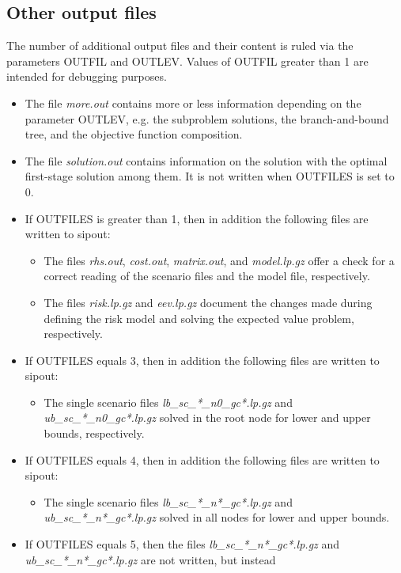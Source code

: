 \documentclass[11pt,draft]{article}
\newcommand{\+}{{\ti{+}}}
\newcommand{\1}{{\ti{1}}}
\begin{document}
\subsection{Other output files}
The number of additional output files and their content is ruled via the parameters OUTFIL and
OUTLEV. Values of OUTFIL greater than 1 are intended for debugging purposes.
\begin{itemize}
\item The file {\it more.out} contains more or less information depending on the parameter OUTLEV,
e.g. the subproblem solutions, the branch-and-bound tree, and the objective function composition. 
\item The file {\it solution.out} contains information on the solution with the optimal first-stage
solution among them. It is not written when OUTFILES is set to 0.
\item If OUTFILES is greater than 1, then in addition the following files are written to sipout:
\begin{itemize}
\item The files {\it rhs.out}, {\it cost.out}, {\it matrix.out}, and {\it model.lp.gz} offer a check
for a correct reading of the scenario files and the model file, respectively. 
\item The files {\it risk.lp.gz} and {\it eev.lp.gz} document the changes made during 
defining the risk model and solving the expected value problem, respectively. 
\end{itemize}
\item If OUTFILES equals 3, then in addition the following files are written to sipout:
\begin{itemize}
\item The  single scenario files {\it lb\_sc\_*\_n0\_gc*.lp.gz} and {\it ub\_sc\_*\_n0\_gc*.lp.gz} solved in the root node for lower and upper bounds, respectively.
\end{itemize}
\item If OUTFILES equals 4, then in addition the following files are written to sipout:
\begin{itemize}
\item The  single scenario files {\it lb\_sc\_*\_n*\_gc*.lp.gz} and {\it ub\_sc\_*\_n*\_gc*.lp.gz} solved in all nodes for lower and upper bounds.
\end{itemize}
\item If OUTFILES equals 5, then the files  {\it lb\_sc\_*\_n*\_gc*.lp.gz} and\\  {\it ub\_sc\_*\_n*\_gc*.lp.gz} are not written, but instead

\end{itemize}
\end{document}
